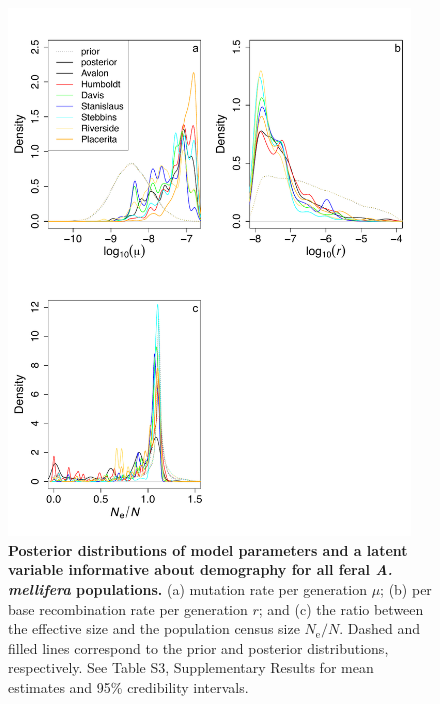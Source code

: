 \documentclass[a4paper, 12pt]{article}
\begin{document}
\begin{figure}[ht]
  \centering
  \includegraphics[width=0.95\textwidth]{Figures/FigureS28_weighted_densityPlots_demography_feralbees.pdf}
  \small\caption{\textbf{Posterior distributions of model parameters and a latent variable informative about demography for all feral \textit{A. mellifera} populations.} (a) mutation rate per generation $\mu$; (b) per base recombination rate per generation $r$; and (c) the ratio between the effective size and the population census size $N_{\mathrm{e}}/N$. Dashed and filled lines correspond to the prior and posterior distributions, respectively. See Table S3, Supplementary Results for mean estimates and 95\% credibility intervals.}
  \label{fig:supple_feralbee_densitydemo}
\end{figure}
\end{document}
